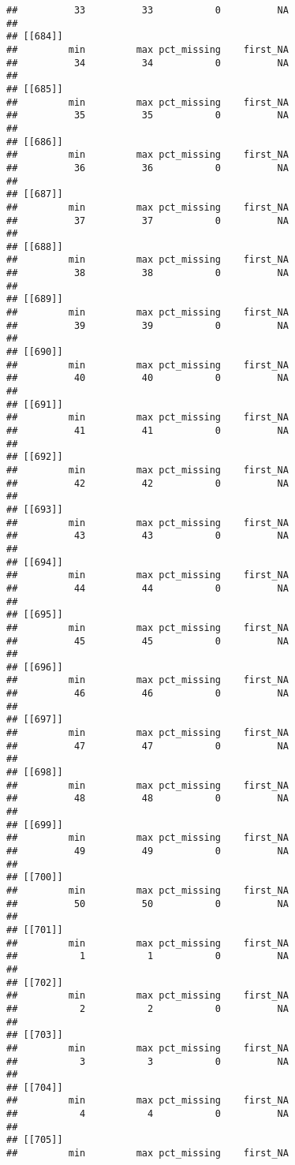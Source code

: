 \documentclass[
]{article}
\begin{document}
\begin{verbatim}
##          33          33           0          NA 
## 
## [[684]]
##         min         max pct_missing    first_NA 
##          34          34           0          NA 
## 
## [[685]]
##         min         max pct_missing    first_NA 
##          35          35           0          NA 
## 
## [[686]]
##         min         max pct_missing    first_NA 
##          36          36           0          NA 
## 
## [[687]]
##         min         max pct_missing    first_NA 
##          37          37           0          NA 
## 
## [[688]]
##         min         max pct_missing    first_NA 
##          38          38           0          NA 
## 
## [[689]]
##         min         max pct_missing    first_NA 
##          39          39           0          NA 
## 
## [[690]]
##         min         max pct_missing    first_NA 
##          40          40           0          NA 
## 
## [[691]]
##         min         max pct_missing    first_NA 
##          41          41           0          NA 
## 
## [[692]]
##         min         max pct_missing    first_NA 
##          42          42           0          NA 
## 
## [[693]]
##         min         max pct_missing    first_NA 
##          43          43           0          NA 
## 
## [[694]]
##         min         max pct_missing    first_NA 
##          44          44           0          NA 
## 
## [[695]]
##         min         max pct_missing    first_NA 
##          45          45           0          NA 
## 
## [[696]]
##         min         max pct_missing    first_NA 
##          46          46           0          NA 
## 
## [[697]]
##         min         max pct_missing    first_NA 
##          47          47           0          NA 
## 
## [[698]]
##         min         max pct_missing    first_NA 
##          48          48           0          NA 
## 
## [[699]]
##         min         max pct_missing    first_NA 
##          49          49           0          NA 
## 
## [[700]]
##         min         max pct_missing    first_NA 
##          50          50           0          NA 
## 
## [[701]]
##         min         max pct_missing    first_NA 
##           1           1           0          NA 
## 
## [[702]]
##         min         max pct_missing    first_NA 
##           2           2           0          NA 
## 
## [[703]]
##         min         max pct_missing    first_NA 
##           3           3           0          NA 
## 
## [[704]]
##         min         max pct_missing    first_NA 
##           4           4           0          NA 
## 
## [[705]]
##         min         max pct_missing    first_NA 

\end{verbatim}
\end{document}

